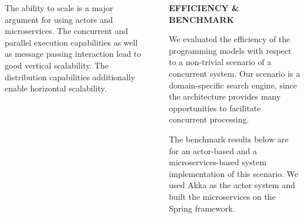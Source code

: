 \documentclass[final,hyperref={pdfpagelabels=true}]{beamer}
\begin{document}
\begin{frame}
\begin{columns}[t]
\begin{column}{.44\textwidth}
{\begin{description}
          \vspace*{\baselineskip}

          \item[\textbf{\textsf{Scalability}}] 
          \begin{justify}
          The ability to scale is a major argument for using actors and microservices. The concurrent and parallel execution capabilities as well as message passing interaction lead to good vertical scalability. The distribution capabilities additionally enable horizontal scalability.
          \end{justify}
        \end{description}
        
      }
    \end{column}
    \begin{column}{.06\textwidth}
      \end{column}
    \begin{column}{.44\textwidth}
      \textsf{\textbf{EFFICIENCY \& BENCHMARK}} \\
      \vspace*{\baselineskip}
      {\lmodern
        \begin{justify}
        We evaluated the efficiency of the programming models with respect to a non-trivial scenario of a concurrent system. Our scenario is a domain-specific search engine, since the architecture provides many opportunities to facilitate concurrent processing. 
        
        \vspace*{\baselineskip}
        
        The benchmark results below are for an actor-based and a microservices-based system implementation of this scenario. We used Akka as the actor system and built the microservices on the Spring framework.
        \end{justify}
      }

      \vspace*{\baselineskip}
      

\end{column}
\end{columns}
\end{frame}
\end{document}
